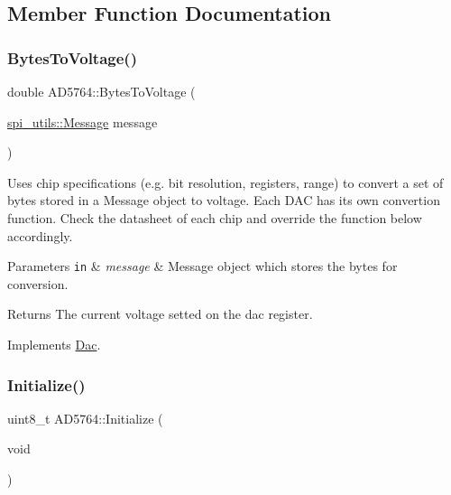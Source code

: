 \subsection{Member Function Documentation}
\mbox{\label{classAD5764_a729015992eda059ae615373d1db53823}} 
\subsubsection{\texorpdfstring{Bytes\+To\+Voltage()}{BytesToVoltage()}}
{\footnotesize\ttfamily double A\+D5764\+::\+Bytes\+To\+Voltage (\begin{DoxyParamCaption}\item[{\mbox{\hyperlink{structspi__utils_1_1Message}{spi\+\_\+utils\+::\+Message}}}]{message }\end{DoxyParamCaption})\hspace{0.3cm}{\ttfamily [virtual]}}

Uses chip specifications (e.\+g. bit resolution, registers, range) to convert a set of bytes stored in a Message object to voltage. Each D\+AC has its own convertion function. Check the datasheet of each chip and override the function below accordingly. 
\begin{DoxyParams}[1]{Parameters}
\mbox{\tt in}  & {\em message} & Message object which stores the bytes for conversion. \\
\hline
\end{DoxyParams}
\begin{DoxyReturn}{Returns}
The current voltage setted on the dac register. 
\end{DoxyReturn}


Implements \mbox{\hyperlink{classDac_a1df39dc8c6e5b50afd07b6dd8a6b9300}{Dac}}.

\mbox{\label{classAD5764_ab98c5418cf46198dd4b967e143896a3a}} 
\subsubsection{\texorpdfstring{Initialize()}{Initialize()}}
{\footnotesize\ttfamily uint8\+\_\+t A\+D5764\+::\+Initialize (\begin{DoxyParamCaption}\item[{void}]{ }\end{DoxyParamCaption})\hspace{0.3cm}{\ttfamily [inline]}}

